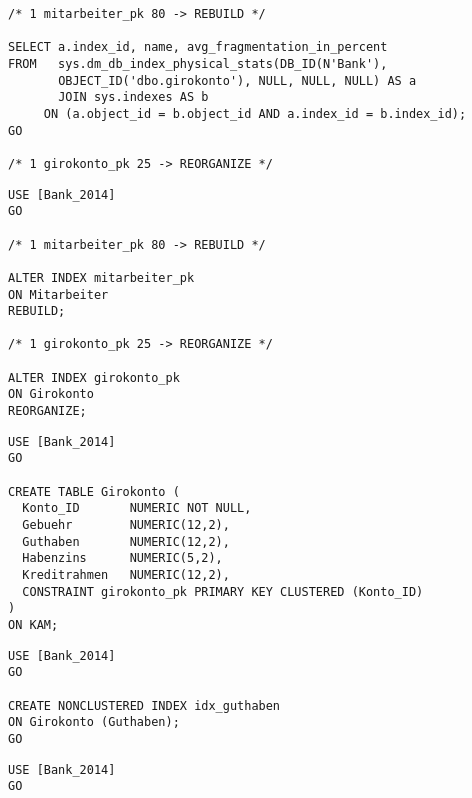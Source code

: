 \begin{enumerate}
\begin{lstlisting}[language=ms_sql]
/* 1 mitarbeiter_pk 80 -> REBUILD */ 

SELECT a.index_id, name, avg_fragmentation_in_percent
FROM   sys.dm_db_index_physical_stats(DB_ID(N'Bank'), 
       OBJECT_ID('dbo.girokonto'), NULL, NULL, NULL) AS a
       JOIN sys.indexes AS b
     ON (a.object_id = b.object_id AND a.index_id = b.index_id);
GO

/* 1 girokonto_pk 25 -> REORGANIZE */
        \end{lstlisting}

        
        \begin{lstlisting}[language=ms_sql]
USE [Bank_2014]
GO

/* 1 mitarbeiter_pk 80 -> REBUILD */ 

ALTER INDEX mitarbeiter_pk 
ON Mitarbeiter
REBUILD;

/* 1 girokonto_pk 25 -> REORGANIZE */

ALTER INDEX girokonto_pk
ON Girokonto
REORGANIZE;
        \end{lstlisting}
\clearpage
        
        \begin{lstlisting}[language=ms_sql]
USE [Bank_2014]
GO

CREATE TABLE Girokonto (
  Konto_ID       NUMERIC NOT NULL,
  Gebuehr        NUMERIC(12,2),
  Guthaben       NUMERIC(12,2),
  Habenzins      NUMERIC(5,2),
  Kreditrahmen   NUMERIC(12,2),
  CONSTRAINT girokonto_pk PRIMARY KEY CLUSTERED (Konto_ID)
)
ON KAM;
        \end{lstlisting}

        
        \begin{lstlisting}[language=ms_sql]
USE [Bank_2014]
GO

CREATE NONCLUSTERED INDEX idx_guthaben
ON Girokonto (Guthaben);
GO
        \end{lstlisting}

        
        \begin{lstlisting}[language=ms_sql]
USE [Bank_2014]
GO


\end{lstlisting}
\end{enumerate}
